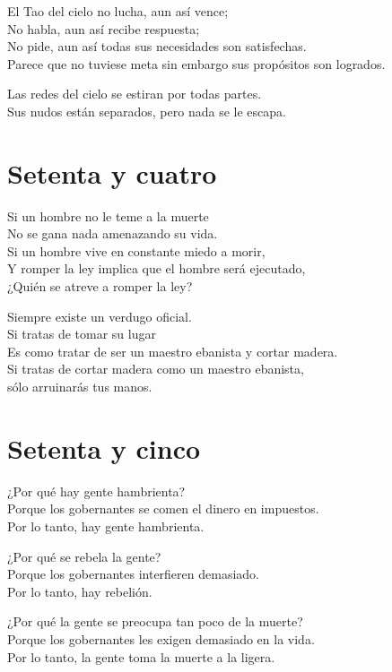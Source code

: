 \documentclass[hidelinks]{memoir}
\begin{document}
	El Tao del cielo no lucha, aun así vence;\\
	No habla, aun así recibe respuesta;\\
	No pide, aun así todas sus necesidades son satisfechas.\\
	Parece que no tuviese meta sin embargo sus propósitos son logrados.
	
	Las redes del cielo se estiran por todas partes.\\
	Sus nudos están separados, pero nada se le escapa.
	
	\chapter*{Setenta y cuatro}
	
	Si un hombre no le teme a la muerte\\
	No se gana nada amenazando su vida.\\
	Si un hombre vive en constante miedo a morir,\\
	Y romper la ley implica que el hombre será ejecutado,\\
	¿Quién se atreve a romper la ley?
	
	Siempre existe un verdugo oficial.\\
	Si tratas de tomar su lugar\\
	Es como tratar de ser un maestro ebanista y cortar madera.\\
	Si tratas de cortar madera como un maestro ebanista,\\
	sólo arruinarás tus manos.
	
	\chapter*{Setenta y cinco}
	
	¿Por qué hay gente hambrienta?\\
	Porque los gobernantes se comen el dinero en impuestos.\\
	Por lo tanto, hay gente hambrienta.
	
	¿Por qué se rebela la gente?\\
	Porque los gobernantes interfieren demasiado.\\
	Por lo tanto, hay rebelión.
	
	¿Por qué la gente se preocupa tan poco de la muerte?\\
	Porque los gobernantes les exigen demasiado en la vida.\\
	Por lo tanto, la gente toma la muerte a la ligera.
	
\end{document}

